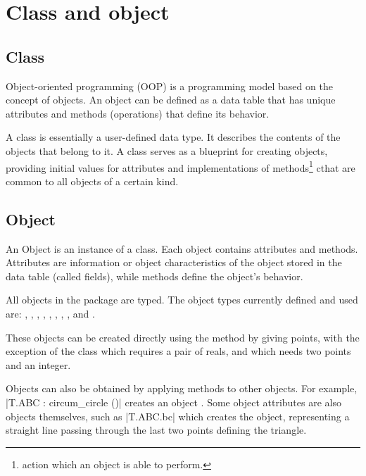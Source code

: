 \newpage

\section{Class and object} %
\label{sec:class_and_object}

\subsection{Class} %
\label{sub:class}

 Object-oriented programming (OOP)  is a programming model based on the concept of objects. An object can be defined as a data table that has unique attributes and methods (operations) that define its behavior.
 
 \vspace{1em}
A class is essentially a user-defined data type. It describes the contents of the objects that belong to it. A class serves as a  blueprint  for creating objects, providing initial values for   attributes and implementations of methods\footnote{action which an object is able to perform.} cthat are common to all objects of a certain kind.

\subsection{Object} %
\label{sub:object}
 An Object is an instance of a class. Each object contains attributes and methods. Attributes are information or object characteristics of the object stored in the data table (called fields), while methods define the object's behavior.
 
  \vspace{1em}
 All objects in the package are typed. The object types currently defined and used are: , , , , , , , ,  and . 

These objects can be created directly using the method  by giving points, with the exception of the  class which requires a pair of reals, and  which needs two points and an integer.

 Objects can also be obtained by applying methods to other objects. For example, |T.ABC : circum_circle ()| creates an object . Some object attributes are also objects themselves, such as |T.ABC.bc| which creates the   object, representing a straight line passing through the last two points defining the triangle.

